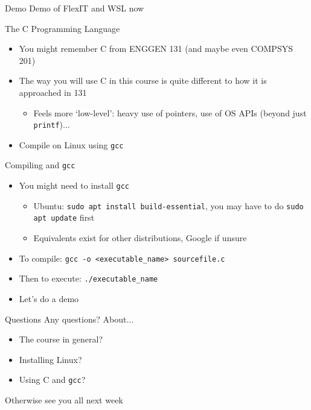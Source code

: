 \documentclass[notes]{beamer}
\begin{document}
\begin{frame}{Demo}
Demo of FlexIT and WSL now
\end{frame}
\begin{frame}{The C Programming Language}
\begin{itemize}
    \item You might remember C from ENGGEN 131 (and maybe even COMPSYS 201)
    \item The way you will use C in this course is quite different to how it is approached in 131
    \begin{itemize}
        \item Feels more `low-level': heavy use of pointers, use of OS APIs (beyond just \texttt{printf})...
    \end{itemize}
    \item Compile on Linux using \texttt{gcc}
\end{itemize}
\end{frame}
\begin{frame}{Compiling and \texttt{gcc}}
\begin{itemize}
    \item You might need to install \texttt{gcc}
    \begin{itemize}
        \item Ubuntu: \texttt{sudo apt install build-essential}, you may have to do \texttt{sudo apt update} first
        \item Equivalents exist for other distributions, Google if unsure
    \end{itemize}
    \item To compile: \texttt{gcc -o <executable\_name> sourcefile.c}
    \item Then to execute: \texttt{./executable\_name}
    \item Let's do a demo
\end{itemize}
\end{frame}
\begin{frame}{Questions}
Any questions? About...
\begin{itemize}
    \item The course in general?
    \item Installing Linux?
    \item Using C and \texttt{gcc}?
\end{itemize}
Otherwise see you all next week
\end{frame}
\end{document}
